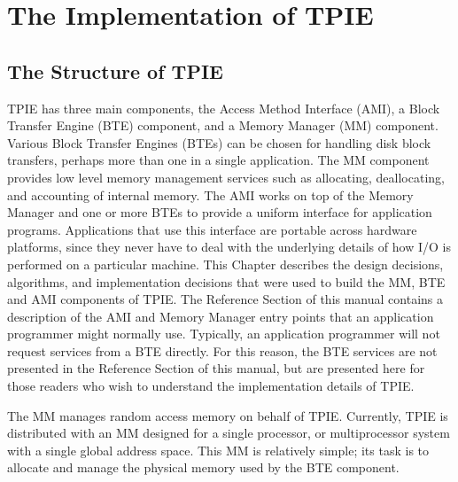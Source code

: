 \chapter{The Implementation of TPIE}
\label{cha:implementation}


\section{The Structure of TPIE}
  TPIE
has three main components, the Access Method Interface
(AMI), a Block Transfer
Engine (BTE) component, and a
Memory Manager (MM) component.
Various Block Transfer Engines (BTEs) can be chosen for
handling disk block transfers, perhaps more than one in a
single application.  The MM component provides low level
memory management services such as allocating, deallocating,
and accounting of internal memory. The AMI works on top of
the Memory Manager and one or more BTEs to provide a uniform
interface for application programs. Applications that use
this interface are portable across hardware platforms, since
they never have to deal with the underlying details of how
I/O is performed on a particular machine. This Chapter
describes the design decisions, algorithms, and
implementation decisions that were used to build the MM, BTE
and AMI components of TPIE. The Reference Section of this
manual contains a description of the AMI and Memory Manager
entry points that an application programmer might normally
use. Typically, an application programmer will not request
services from a BTE directly. For this reason, the BTE
services are not presented in the Reference Section of this
manual, but are presented here for those readers who wish to
understand the implementation details of TPIE.



The MM manages random access memory on behalf of
TPIE.
Currently, TPIE is distributed with an MM designed for a single processor, or
multiprocessor system with a single global address space. This MM is
relatively simple; its task is to allocate and manage the physical memory
used by the BTE component. 

